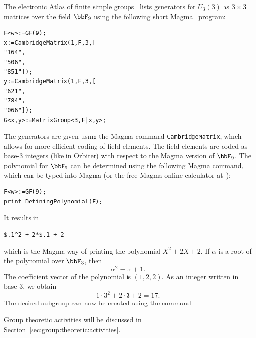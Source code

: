 The electronic Atlas of finite simple groups~\cite{Atlas3} 
lists generators for $U_3(3)$ as $3 \times 3$ matrices over the field $\bbF_9$
using the following short Magma~\cite{Magma} program:
\begin{verbatim}
F<w>:=GF(9);
x:=CambridgeMatrix(1,F,3,[
"164",
"506",
"851"]);
y:=CambridgeMatrix(1,F,3,[
"621",
"784",
"066"]);
G<x,y>:=MatrixGroup<3,F|x,y>;
\end{verbatim} 
The generators are given using the Magma command \verb'CambridgeMatrix', 
which allows for more efficient coding of field elements.
The field elements are coded as base-3 integers (like in Orbiter) 
with respect to the Magma version of $\bbF_9.$ 
The polynomial for $\bbF_9$ can be determined using the 
following Magma command, 
which can be typed into Magma (or 
the free Magma online calculator at~\cite{MagmaOnline}):
\begin{verbatim}
F<w>:=GF(9);
print DefiningPolynomial(F);
\end{verbatim}
It results in
\begin{verbatim}
$.1^2 + 2*$.1 + 2
\end{verbatim}
which is the Magma way of printing the polynomial $X^2+2X+2.$ 
If $\alpha$ is a root of the polynomial over $\bbF_3$, then
$$
\alpha^2 = \alpha+1.
$$
The coefficient vector of 
the polynomial is $(1,2,2).$ 
As an integer written in base-3, we 
obtain 
$$
1\cdot 3^2 + 2 \cdot 3 + 2 = 17.
$$
The desired subgroup can now be created using the command
{\tt

}
Group theoretic activities 
will be discussed in Section~\ref{sec:group:theoretic:activities}.

\bigskip

